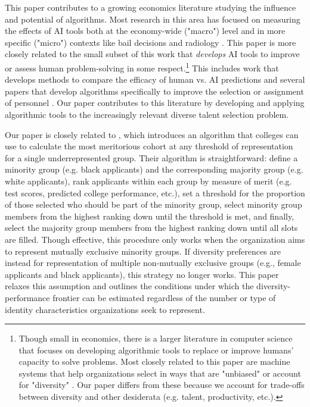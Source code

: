 This paper contributes to a growing economics literature studying the influence and potential of algorithms. Most research in this area has focused on measuring the effects of AI tools both at the economy-wide ("macro") level \cite{acemoglu2022automation,babina2024artificial,calvino2023portrait,zolas2021advanced,webb2019impact} and in more specific ("micro") contexts like bail decisions and radiology \cite{albright2023hidden,kleinberg2015prediction,stevenson2019algorithmic,angelova2023algorithmic,imai2023experimental,grimon2022impact,noy2023experimental,brynjolfsson2023generative,bundorf2019humans, mullainathan2019machine, ribers2020machine, agarwal2023combining}. This paper is more closely related to the small subset of this work that \emph{develops} AI tools to improve or assess human problem-solving in some respect.\footnote{Though small in economics, there is a larger literature in computer science that focuses on developing algorithmic tools to replace or improve humans' capacity to solve problems. Most closely related to this paper are machine systems that help organizations select in ways that are "unbiased" \cite{tambe2019artificial,raghavan2020mitigating} or account for "diversity" \cite{gillet2011diversity,huppenkothen2020entrofy}. Our paper differs from these because we account for trade-offs between diversity and other desiderata (e.g. talent, productivity, etc.).}  This includes work that develops methods to compare the efficacy of human vs. AI predictions \cite{kleinberg2018human,rambachan2024identifying} and several papers that develop algorithms specifically to improve the selection or assignment of personnel \cite{li2020hiring,bergman2021seven,kleinberg2018algorithmic,huppenkothen2020entrofy}. Our paper contributes to this literature by developing and applying algorithmic tools to the increasingly relevant diverse talent selection problem. 

Our paper is closely related to , which introduces an algorithm that colleges can use to calculate the most meritorious cohort at any threshold of representation for a single underrepresented group. Their algorithm is straightforward: define a minority group (e.g. black applicants) and the corresponding majority group (e.g. white applicants), rank applicants within each group by measure of merit (e.g. test scores, predicted college performance, etc.), set a threshold for the proportion of those selected who should be part of the minority group, select minority group members from the highest ranking down until the threshold is met, and finally, select the majority group members from the highest ranking down until all slots are filled. Though effective, this procedure only works when the organization aims to represent mutually exclusive minority groups. If diversity preferences are instead for representation of multiple non-mutually exclusive groups (e.g., female applicants and black applicants), this strategy no longer works. This paper relaxes this assumption and outlines the conditions under which the diversity-performance frontier can be estimated regardless of the number or type of identity characteristics organizations seek to represent.

